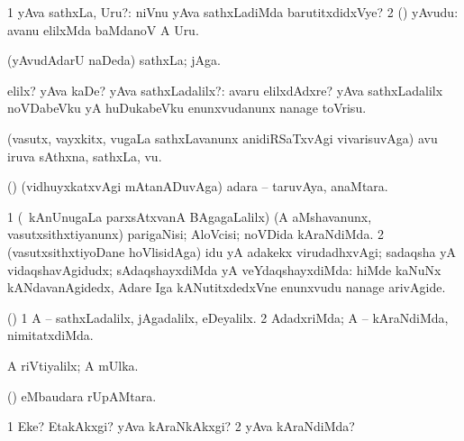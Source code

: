 {{{{{{ \bentry
{}
\gl{\sanA}
\expl{}
\bmng
\bnum
\num{1} yAva sathxLa, Uru?:  niVnu yAva sathxLadiMda barutitxdidxVye? 
\num{2} (\AmA) yAvudu:  avanu elilxMda baMdanoV A Uru. 
\enum
\emng
\eentry

 \bentry
{}
\gl{\nA}
\expl{}
\bmng
(yAvudAdarU naDeda) sathxLa; jAga. 
\emng
\eentry

\bentry
{} 
\gl{\kirxvi}
\expl{}
\bmng
elilx? yAva kaDe? yAva sathxLadalilx?:  avaru elilxdAdxre?  yAva sathxLadalilx noVDabeVku yA huDukabeVku enunxvudanunx nanage toVrisu. 
\emng
\eentry

\bentry
{}
\gl{\nA}
\expl{}
\bmng
(vasutx, vayxkitx, \mo vugaLa sathxLavanunx anidiRSaTxvAgi vivarisuvAga) avu iruva sAthxna, sathxLa, \mo vu. 
\emng
\eentry

\bentry
{} 
\gl{\saMavayx}
\expl{}
\bmng
(\aupa) (vidhuyxkatxvAgi mAtanADuvAga) adara -- taruvAya, anaMtara. 
\emng
\eentry

\bentry
{} 
\gl{\saMavayx}
\expl{}
\bmng
\bnum
\num{1} (\kanmu\ kAnUnugaLa parxsAtxvanA BAgagaLalilx) (A aMshavanunx, vasutxsithxtiyanunx) parigaNisi; AloVcisi; noVDida kAraNdiMda. 
\num{2} (vasutxsithxtiyoDane hoVlisidAga) idu yA adakekx virudadhxvAgi; sadaqsha yA vidaqshavAgidudx; sAdaqshayxdiMda yA veYdaqshayxdiMda:  hiMde kaNuNx kANdavanAgidedx, Adare Iga kANutitxdedxVne enunxvudu nanage arivAgide. 
\enum
\emng
\eentry

\bentry
{} 
\gl{\saMavayx}
\expl{}
\bmng
(\pArxparx) 
\bnum
\num{1} A -- sathxLadalilx, jAgadalilx, eDeyalilx. 
\num{2} AdadxriMda; A -- kAraNdiMda, nimitatxdiMda. 
\enum
\emng
\eentry

\bentry
{} 
\gl{\saMavayx}
\expl{}
\bmng
A riVtiyalilx; A mUlka. 
\emng
\eentry

\bentry
{} 
\expl{}
\bmng
(\kAparx)  eMbaudara rUpAMtara. 
\emng
\eentry

\bentry
{} 
\gl{\kirxvi}
\expl{(\pArxparx) }
\bmng
\bnum
\num{1} Eke? EtakAkxgi? yAva kAraNkAkxgi? 
\num{2} yAva kAraNdiMda? 
\enum
\emng
\eentry

}}}}}}
